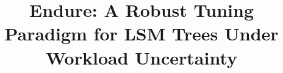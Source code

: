 \documentclass[sigconf,anonymous]{acmart}
\begin{document}
\title{Endure: A Robust Tuning Paradigm for LSM Trees Under Workload Uncertainty}



\maketitle









\balance 



\clearpage


\balance

% 
\end{document}
